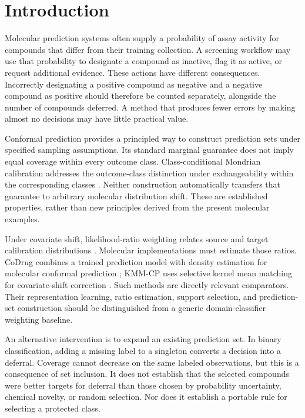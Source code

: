 \documentclass[11pt]{article}
\begin{document}
\section{Introduction}
Molecular prediction systems often supply a probability of assay activity for compounds that differ from their training collection. A screening workflow may use that probability to designate a compound as inactive, flag it as active, or request additional evidence. These actions have different consequences. Incorrectly designating a positive compound as negative and a negative compound as positive should therefore be counted separately, alongside the number of compounds deferred. A method that produces fewer errors by making almost no decisions may have little practical value.

Conformal prediction provides a principled way to construct prediction sets under specified sampling assumptions. Its standard marginal guarantee does not imply equal coverage within every outcome class. Class-conditional Mondrian calibration addresses the outcome-class distinction under exchangeability within the corresponding classes \citep{vovk2012}. Neither construction automatically transfers that guarantee to arbitrary molecular distribution shift. These are established properties, rather than new principles derived from the present molecular examples.

Under covariate shift, likelihood-ratio weighting relates source and target calibration distributions \citep{tibshirani2019}. Molecular implementations must estimate those ratios. CoDrug combines a trained prediction model with density estimation for molecular conformal prediction \citep{codrug2023}; KMM-CP uses selective kernel mean matching for covariate-shift correction \citep{kmm2026}. Such methods are directly relevant comparators. Their representation learning, ratio estimation, support selection, and prediction-set construction should be distinguished from a generic domain-classifier weighting baseline.

An alternative intervention is to expand an existing prediction set. In binary classification, adding a missing label to a singleton converts a decision into a deferral. Coverage cannot decrease on the same labeled observations, but this is a consequence of set inclusion. It does not establish that the selected compounds were better targets for deferral than those chosen by probability uncertainty, chemical novelty, or random selection. Nor does it establish a portable rule for selecting a protected class.
\end{document}
